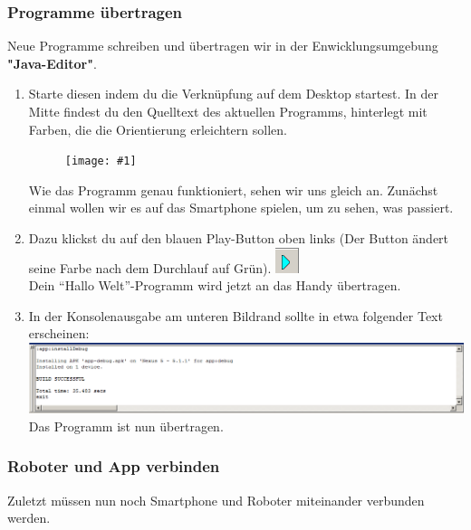 \documentclass[
	12pt,
	article,
	type=bsc, %
	colorbacktitle,
	instlogo,
	accentcolor=tud1c,
	german,
	twoside
]{tudexercise}
\newcommand{\gcenterone}[1]{
	\begin{figure}[h]
	\centering 
	\texttt{[image: \#1]}
	\end{figure}
}
\begin{document}
	\newpage
	
	
	\subsubsection{Programme übertragen}
	Neue Programme schreiben und übertragen wir in der	Enwicklungsumgebung \textbf{"Java-Editor"}.
	
	\begin{enumerate}
	\item Starte diesen indem du die Verknüpfung auf dem Desktop startest. In der Mitte findest du den Quelltext des aktuellen Programms, hinterlegt mit Farben, die die Orientierung erleichtern sollen.
	
	\gcenterone{img/je_main.png}
	
	Wie das Programm genau funktioniert, sehen wir uns gleich an. Zunächst einmal wollen wir es auf das Smartphone spielen, um zu sehen, was passiert.
	
	\item Dazu klickst du auf den blauen Play-Button oben links (Der Button ändert seine Farbe nach dem Durchlauf auf Grün). 
	\includegraphics{img/je_playbutton.png} \\ Dein “Hallo Welt”-Programm wird jetzt an das Handy übertragen.
	
	\item In der Konsolenausgabe am unteren Bildrand sollte in etwa folgender Text erscheinen:
	\includegraphics[width=\textwidth]{img/je_console.png}
	Das Programm ist nun übertragen.
	\end{enumerate}
	\newpage
	\subsubsection{Roboter und App verbinden}
	Zuletzt müssen nun noch Smartphone und Roboter miteinander verbunden werden. 
	
\end{document}
